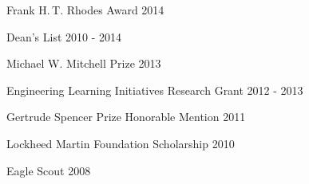 
Frank H.\,T. Rhodes Award                       \hfill 2014

Dean's List                                     \hfill 2010 - 2014

Michael W. Mitchell Prize                       \hfill 2013

Engineering Learning Initiatives Research Grant \hfill 2012 - 2013

Gertrude Spencer Prize Honorable Mention        \hfill 2011

Lockheed Martin Foundation Scholarship          \hfill 2010

Eagle Scout                                     \hfill 2008

